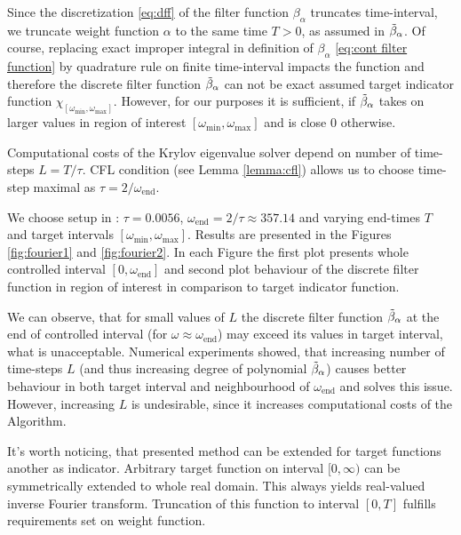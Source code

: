 \documentclass[a4paper,11pt,bibliography=totoc,listof=totoc,headinclude=true,cleardoublepage=empty,oneside]{scrbook}
\newcommand{\dff}{\Tilde{\beta}_\alpha}
\newcommand{\e}{\mathrm{end}}
\begin{document}
Since the discretization \eqref{eq:dff} of the filter function $\beta_\alpha$ truncates time-interval, we truncate weight function $\alpha$ to the same time $T>0$, as assumed in $\dff$. Of course, replacing exact improper integral in definition of $\beta_\alpha$ \eqref{eq:cont filter function} by quadrature rule on finite time-interval impacts the function and therefore the discrete filter function $\dff$ can not be exact assumed target indicator function $\chi_{\left[\omega_{\min}, \omega_{\max}\right]}$. However, for our purposes it is sufficient, if $\dff$ takes on larger values in region of interest $\left[\omega_{\min}, \omega_{\max}\right]$ and is close 0 otherwise. 

Computational costs of the Krylov eigenvalue solver depend on number of time-steps $L=T/\tau$. CFL condition (see Lemma \ref{lemma:cfl}) allows us to choose time-step maximal as $\tau = 2/\omega_{\e}$. 

We choose setup in \cite[section 3.1.2]{nannen}: $\tau = 0.0056$, $\omega_\e = 2/\tau \approx 357.14$ and varying end-times $T$ and target intervals $\left[\omega_{\min}, \omega_{\max}\right]$. Results are presented in the Figures \ref{fig:fourier1} and \ref{fig:fourier2}. In each Figure the first plot presents whole controlled interval $\left[0, \omega_\e\right]$ and second plot behaviour of the discrete filter function in region of interest in comparison to target indicator function.

We can observe, that for small values of $L$ the discrete filter function $\dff$ at the end of controlled interval (for $\omega \approx \omega_\e$) may exceed its values in target interval, what is unacceptable. Numerical experiments showed, that increasing number of time-steps $L$ (and thus increasing degree of polynomial $\dff$) causes better behaviour in both target interval and neighbourhood of $\omega_\e$ and solves this issue. However, increasing $L$ is undesirable, since it increases computational costs of the Algorithm.

It's worth noticing, that presented method can be extended for target functions another as indicator. Arbitrary target function on interval $[0, \infty)$ can be symmetrically extended to whole real domain. This always yields real-valued inverse Fourier transform. Truncation of this function to interval $[0, T]$ fulfills requirements set on weight function. 
\end{document}
